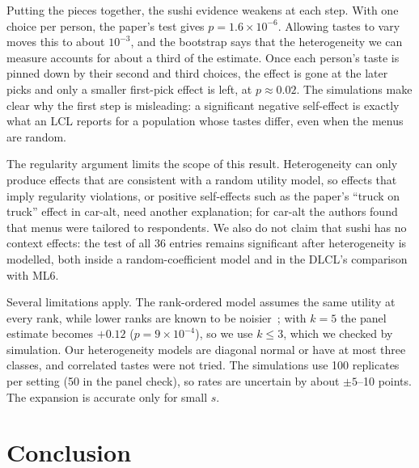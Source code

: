 \documentclass[11pt,journal,a4paper]{IEEEtran}
\begin{document}
Putting the pieces together, the sushi evidence weakens at each step. With one choice per person, the paper's
test gives $p=1.6\times10^{-6}$. Allowing tastes to vary moves this to about $10^{-3}$, and the bootstrap says
that the heterogeneity we can measure accounts for about a third of the estimate. Once each person's taste is
pinned down by their second and third choices, the effect is gone at the later picks and only a smaller
first-pick effect is left, at $p\approx0.02$. The simulations make clear why the first step is misleading: a
significant negative self-effect is exactly what an LCL reports for a population whose tastes differ, even
when the menus are random.

The regularity argument limits the scope of this result. Heterogeneity can only produce effects that are
consistent with a random utility model, so effects that imply regularity violations, or positive self-effects
such as the paper's ``truck on truck'' effect in car-alt, need another explanation; for car-alt the authors
found that menus were tailored to respondents. We also do not claim that sushi has no context effects: the test
of all 36 entries remains significant after heterogeneity is modelled, both inside a random-coefficient model
and in the DLCL's comparison with ML6.

Several limitations apply. The rank-ordered model assumes the same utility at every rank, while lower ranks
are known to be noisier~\cite{hr87}; with $k=5$ the panel estimate becomes $+0.12$ ($p=9\times10^{-4}$), so we
use $k\le3$, which we checked by simulation. Our heterogeneity models are diagonal normal or have at most three
classes, and correlated tastes were not tried. The simulations use 100 replicates per setting (50 in the
panel check), so rates are uncertain by about $\pm5$--10 points. The expansion is accurate only for small $s$.

\section{Conclusion}
\end{document}
